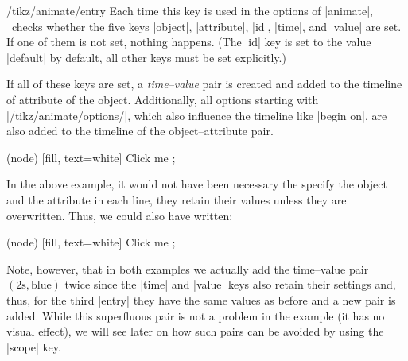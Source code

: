 \begin{key}{/tikz/animate/entry}
    Each time this key is used in the options of |animate|, \tikzname\ checks
    whether the five keys |object|, |attribute|, |id|, |time|, and |value| are
    set. If one of them is not set, nothing happens. (The |id| key is set to
    the value |default| by default, all other keys must be set explicitly.)

    If all of these keys are set, a \emph{time--value} pair is created and
    added to the timeline of attribute of the object. Additionally, all options
    starting with |/tikz/animate/options/|, which also influence the timeline
    like |begin on|, are also added to the timeline of the object--attribute
    pair.
\begin{codeexample}[imagesource={standalone/pgfmanual-en-tikz-animations-animation-6.svg}]
\tikz [animate = {
  object = node, attribute = fill, time = 0s, value = red, entry,
  object = node, attribute = fill, time = 2s, value = blue, entry,
  object = node, attribute = fill, begin on = click, entry}]
  \node (node) [fill, text=white] { Click me };
\end{codeexample}
    In the above example, it would not have been necessary the specify the
    object and the attribute in each line, they retain their values unless they
    are overwritten. Thus, we could also have written:
\begin{codeexample}[imagesource={standalone/pgfmanual-en-tikz-animations-animation-7.svg}]
\tikz [animate = {
  object = node, attribute = fill, time = 0s, value = red, entry,
                                   time = 2s, value = blue, entry,
                                   begin on = click, entry}]
  \node (node) [fill, text=white] { Click me };
\end{codeexample}
    Note, however, that in both examples we actually add the time--value pair
    $(2\mathrm{s}, \mathrm{blue})$ twice since the |time| and |value| keys also
    retain their settings and, thus, for the third |entry| they have the same
    values as before and a new pair is added. While this superfluous pair is
    not a problem in the example (it has no visual effect), we will see later
    on how such pairs can be avoided by using the |scope| key.


\end{key}
